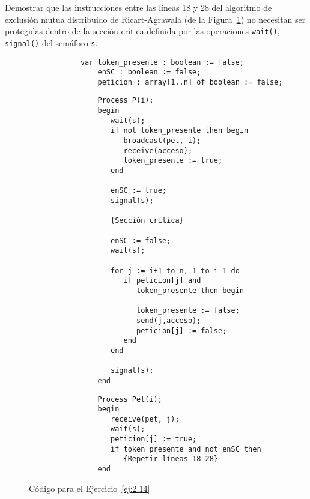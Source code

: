 \begin{ejercicio}\label{ej:2.14}
    Demostrar que las instrucciones entre las líneas 18 y 28 del algoritmo de exclusión mutua distribuido de Ricart-Agrawala (de la Figura~\ref{fig:cod_14}) no necesitan ser protegidas dentro de la sección crítica definida por las operaciones \verb|wait()|, \verb|signal()| del semáforo \verb|s|.
    \begin{figure}
        \centering
        \begin{verbatim}
            var token_presente : boolean := false;
                enSC : boolean := false;
                peticion : array[1..n] of boolean := false;
        \end{verbatim}
        \setlength{\columnsep}{1cm}
        \begin{multicols}{2}
            \begin{verbatim}
                Process P(i);
                begin
                   wait(s);
                   if not token_presente then begin
                      broadcast(pet, i);
                      receive(acceso);
                      token_presente := true;
                   end

                   enSC := true;
                   signal(s);

                   {Sección crítica}

                   enSC := false;
                   wait(s);

                   for j := i+1 to n, 1 to i-1 do
                      if peticion[j] and 
                         token_presente then begin

                         token_presente := false;
                         send(j,acceso);
                         peticion[j] := false;
                      end
                   end

                   signal(s);
                end
            \end{verbatim}
            \begin{verbatim}
                Process Pet(i);
                begin
                   receive(pet, j);
                   wait(s);
                   peticion[j] := true;
                   if token_presente and not enSC then
                      {Repetir líneas 18-28}
                end
            \end{verbatim}
        \end{multicols}
        \caption{Código para el Ejercicio~\ref{ej:2.14}}
        \label{fig:cod_14}
    \end{figure}
\end{ejercicio}

